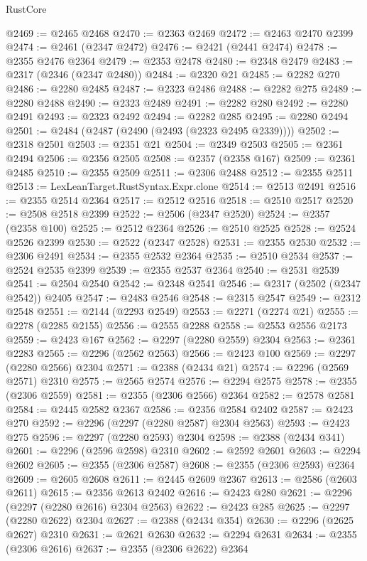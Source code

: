 \begin{lexlean}{RustCore}
\begin{coremodule}
@2469 := @2465 @2468
@2470 := @2363 @2469
@2472 := @2463 @2470 @2399
@2474 := @2461 (@2347 @2472)
@2476 := @2421 (@2441 @2474)
@2478 := @2355 @2476 @2364
@2479 := @2353 @2478
@2480 := @2348 @2479
@2483 := @2317 (@2346 (@2347 @2480))
@2484 := @2320 @21
@2485 := @2282 @270
@2486 := @2280 @2485
@2487 := @2323 @2486
@2488 := @2282 @275
@2489 := @2280 @2488
@2490 := @2323 @2489
@2491 := @2282 @280
@2492 := @2280 @2491
@2493 := @2323 @2492
@2494 := @2282 @285
@2495 := @2280 @2494
@2501 := @2484 (@2487 (@2490 (@2493 (@2323 @2495 @2339))))
@2502 := @2318 @2501
@2503 := @2351 @21
@2504 := @2349 @2503
@2505 := @2361 @2494
@2506 := @2356 @2505
@2508 := @2357 (@2358 @167)
@2509 := @2361 @2485
@2510 := @2355 @2509
@2511 := @2306 @2488
@2512 := @2355 @2511
@2513 := LexLeanTarget.RustSyntax.Expr.clone
@2514 := @2513 @2491
@2516 := @2355 @2514 @2364
@2517 := @2512 @2516
@2518 := @2510 @2517
@2520 := @2508 @2518 @2399
@2522 := @2506 (@2347 @2520)
@2524 := @2357 (@2358 @100)
@2525 := @2512 @2364
@2526 := @2510 @2525
@2528 := @2524 @2526 @2399
@2530 := @2522 (@2347 @2528)
@2531 := @2355 @2530
@2532 := @2306 @2491
@2534 := @2355 @2532 @2364
@2535 := @2510 @2534
@2537 := @2524 @2535 @2399
@2539 := @2355 @2537 @2364
@2540 := @2531 @2539
@2541 := @2504 @2540
@2542 := @2348 @2541
@2546 := @2317 (@2502 (@2347 @2542)) @2405
@2547 := @2483 @2546
@2548 := @2315 @2547
@2549 := @2312 @2548
@2551 := @2144 (@2293 @2549)
@2553 := @2271 (@2274 @21)
@2555 := @2278 (@2285 @2155)
@2556 := @2555 @2288
@2558 := @2553 @2556 @2173
@2559 := @2423 @167
@2562 := @2297 (@2280 @2559) @2304
@2563 := @2361 @2283
@2565 := @2296 (@2562 @2563)
@2566 := @2423 @100
@2569 := @2297 (@2280 @2566) @2304
@2571 := @2388 (@2434 @21)
@2574 := @2296 (@2569 @2571) @2310
@2575 := @2565 @2574
@2576 := @2294 @2575
@2578 := @2355 (@2306 @2559)
@2581 := @2355 (@2306 @2566) @2364
@2582 := @2578 @2581
@2584 := @2445 @2582 @2367
@2586 := @2356 @2584 @2402
@2587 := @2423 @270
@2592 := @2296 (@2297 (@2280 @2587) @2304 @2563)
@2593 := @2423 @275
@2596 := @2297 (@2280 @2593) @2304
@2598 := @2388 (@2434 @341)
@2601 := @2296 (@2596 @2598) @2310
@2602 := @2592 @2601
@2603 := @2294 @2602
@2605 := @2355 (@2306 @2587)
@2608 := @2355 (@2306 @2593) @2364
@2609 := @2605 @2608
@2611 := @2445 @2609 @2367
@2613 := @2586 (@2603 @2611)
@2615 := @2356 @2613 @2402
@2616 := @2423 @280
@2621 := @2296 (@2297 (@2280 @2616) @2304 @2563)
@2622 := @2423 @285
@2625 := @2297 (@2280 @2622) @2304
@2627 := @2388 (@2434 @354)
@2630 := @2296 (@2625 @2627) @2310
@2631 := @2621 @2630
@2632 := @2294 @2631
@2634 := @2355 (@2306 @2616)
@2637 := @2355 (@2306 @2622) @2364

\end{coremodule}
\end{lexlean}
